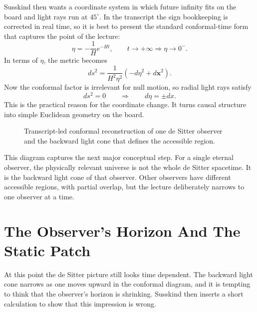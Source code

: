 Susskind then wants a coordinate system in which future infinity fits on the board and light rays run at \(45^\circ\). In the transcript the sign bookkeeping is corrected in real time, so it is best to present the standard conformal-time form that captures the point of the lecture:
\begin{equation}
\eta=-\frac{1}{H}e^{-Ht},
\qquad
t\to +\infty \Longrightarrow \eta\to 0^-.
\end{equation}
In terms of \(\eta\), the metric becomes
\begin{equation}
ds^2=\frac{1}{H^2\eta^2}\left(-d\eta^2+d\mathbf{x}^2\right).
\end{equation}
Now the conformal factor is irrelevant for null motion, so radial light rays satisfy
\begin{equation}
ds^2=0
\qquad\Longrightarrow\qquad
d\eta=\pm dx.
\end{equation}
This is the practical reason for the coordinate change. It turns causal structure into simple Euclidean geometry on the board.

\begin{figure}
\centering
{}
\caption{Transcript-led conformal reconstruction of one de Sitter observer and the backward light cone that defines the accessible region.}
\end{figure}

This diagram captures the next major conceptual step. For a single eternal observer, the physically relevant universe is not the whole de Sitter spacetime. It is the backward light cone of that observer. Other observers have different accessible regions, with partial overlap, but the lecture deliberately narrows to one observer at a time.

\section{The Observer's Horizon And The Static Patch}

At this point the de Sitter picture still looks time dependent. The backward light cone narrows as one moves upward in the conformal diagram, and it is tempting to think that the observer's horizon is shrinking. Susskind then inserts a short calculation to show that this impression is wrong.

